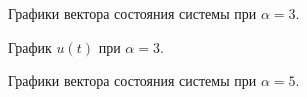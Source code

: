 \begin{figure}[!h]
	\caption{Графики вектора состояния системы при $\alpha = 3$.}
	\label{4_2_x_3}
\end{figure}

\begin{figure}[!h]
	\caption{График $u(t)$ при $\alpha = 3$.}
	\label{4_2_u_3}
\end{figure}


\begin{figure}[!h]
	\caption{Графики вектора состояния системы при $\alpha = 5$.}
	\label{4_2_x_5}
\end{figure}

